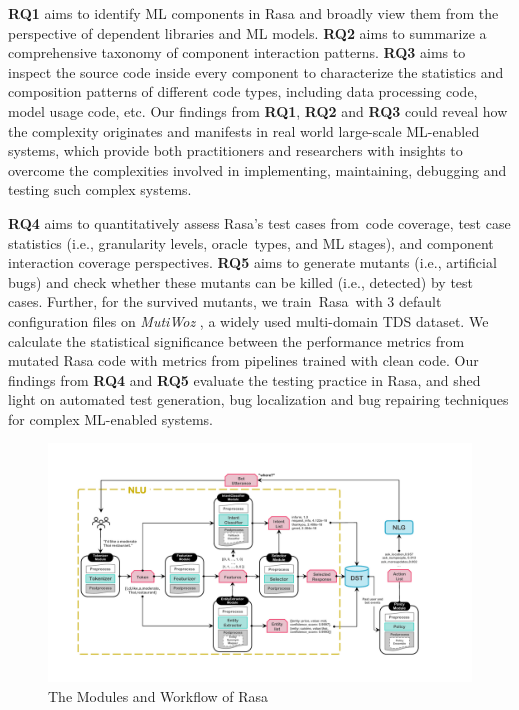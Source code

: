 \textbf{RQ1} aims to identify ML components in Rasa and broadly view them from the perspective of dependent libraries and ML models. 
\textbf{RQ2} aims to summarize a comprehensive taxonomy of component interaction patterns. 
\textbf{RQ3} aims to inspect the source code inside every component to characterize the statistics and composition patterns of different code types, including data processing code, model usage code, etc. 
Our findings from \textbf{RQ1}, \textbf{RQ2} and \textbf{RQ3} could reveal how the complexity originates and manifests in real world large-scale ML-enabled systems, which provide both practitioners and researchers with insights to overcome the complexities involved in implementing, maintaining, debugging and testing such complex systems. 

\textbf{RQ4} aims to quantitatively assess Rasa's test cases from~code coverage, test case statistics (i.e., granularity levels, oracle~types, and ML stages), and component interaction coverage perspectives. 
\textbf{RQ5} aims to generate mutants (i.e., artificial bugs) and check whether these mutants can be killed (i.e., detected) by test cases. 
Further, for the survived mutants, we train~Rasa~with 3 default configuration files on \textit{MutiWoz} \cite{multiwoz}, a widely used multi-domain TDS dataset. 
We calculate the statistical significance between the performance metrics from mutated Rasa code with metrics from pipelines trained with clean code.
Our findings from \textbf{RQ4} and \textbf{RQ5} evaluate the testing practice in Rasa, and shed light on automated test generation, bug localization and bug repairing techniques for complex ML-enabled systems.


\begin{figure}[!t]
\centering
\includegraphics[scale=0.60]{figs/overview.pdf}
\caption{The Modules and Workflow of Rasa}\label{overview_fig}
\end{figure}

